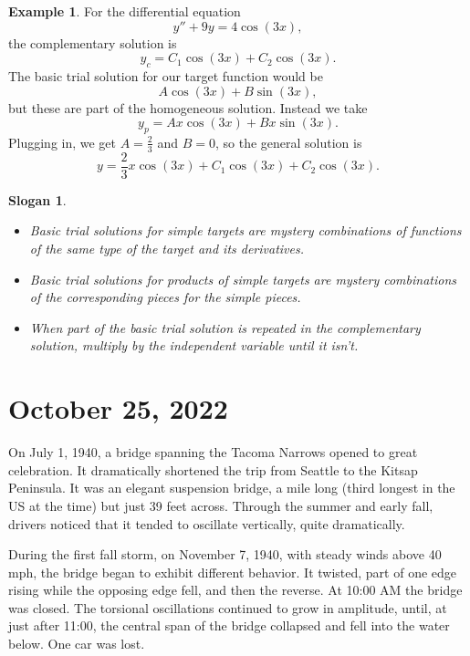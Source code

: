 \documentclass[12pt]{amsart}
\numberwithin{equation}{section}
\theoremstyle{plain} %
\newtheorem{slogan}[equation]{Slogan}
\newcommand{\Oct}[1]{\section{October #1, 2022}}
\newcommand{\rsa}{\rightsquigarrow}
\theoremstyle{definition}
\newtheorem{ex}[equation]{Example}
\theoremstyle{remark}
\begin{document}
\begin{ex} For the differential equation
\[ y'' + 9y = 4 \cos(3x),\]
the complementary solution is 
\[ y_c= C_1 \cos(3x) + C_2 \cos(3x).\]
The basic trial solution for our target function would be
\[ A \cos(3x) + B\sin(3x),\]
but these are part of the homogeneous solution. Instead we take
\[ y_p = A x \cos(3x) + B x \sin(3x).\]
Plugging in, we get $A=\frac{2}{3}$ and $B=0$, so the general solution is
\[ y= \frac{2}{3} x \cos(3x) + C_1 \cos(3x) + C_2 \cos(3x).\]
\end{ex}

\begin{slogan}
\begin{itemize}
\item Basic trial solutions for simple targets are mystery combinations of functions of the same type of the target and its derivatives.
\item Basic trial solutions for products of simple targets are mystery combinations of the corresponding pieces for the simple pieces.
\item When part of the basic trial solution is repeated in the complementary solution, multiply by the independent variable until it isn't.
\end{itemize}
\end{slogan}




\Oct{25}

On July 1, 1940, a bridge spanning the Tacoma Narrows opened
to great celebration. It dramatically shortened the trip from Seattle
to the Kitsap Peninsula. It was an elegant suspension bridge, a mile
long (third longest in the US at the time) but just 39 feet across.
Through the summer and early fall, drivers noticed that it tended to
oscillate vertically, quite dramatically. 

During the first fall storm, on November 7, 1940, with steady winds
above 40 mph, the bridge began to exhibit different behavior. It
twisted, part of one edge rising while the opposing edge fell, and then
the reverse. At 10:00 AM the bridge was closed. The torsional oscillations continued to grow in amplitude, until, at just after 11:00, the
central span of the bridge collapsed and fell into the water below. One
car was lost.
\end{document}
